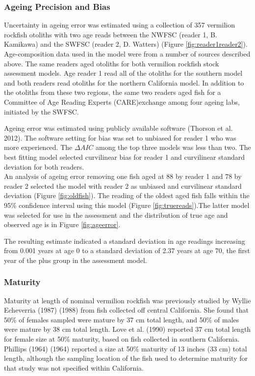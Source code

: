 \documentclass[
  english,
  a4paper,
]{article}
\begin{document}
\hypertarget{ageing-precision-and-bias}{%
\subsubsection{Ageing Precision and Bias}\label{ageing-precision-and-bias}}

Uncertainty in ageing error was estimated using a collection of 357 vermilion rockfish
otoliths with two age reads between the NWFSC (reader 1, B. Kamikawa) and the
SWFSC (reader 2, D. Watters) (Figure \ref{fig:reader1reader2}).
Age-composition data used in the model were from a number of sources described
above. The same readers aged otoliths for both vermilion rockfish stock assessment models.
Age reader 1 read all of the otoliths for the southern model and both readers read
otoliths for the northern California model. In addition to the otoliths from these
two regions, the same two readers aged fish for a Committee of Age Reading Experts
(CARE)exchange among four ageing labs, initiated by the SWFSC.

Ageing error was estimated using publicly available software (Thorson et al. 2012).
The software setting for bias was set to unbiased for reader 1 who was more
experienced. The \(\Delta AIC\) among the top three models was less than two. The
best fitting model selected curvilinear bias for reader 1 and curvilinear standard
deviation for both readers.\\
An analysis of ageing error removing one fish aged at 88 by reader 1 and 78 by reader 2
selected the model with reader 2 as unbiased and curvilinear standard deviation
(Figure \ref{fig:oldfish}). The reading of the oldest aged fish falls within the 95\% confidence
interval using this model (Figure \ref{fig:truereads}).The latter model was selected
for use in the assessment and the distribution of true age and observed
age is in Figure \ref{fig:ageerror}.

The resulting estimate indicated a standard deviation in age readings
increasing from 0.001 years at age 0 to a standard deviation of 2.37 years at age 70,
the first year of the plus group in the assessment model.

\hypertarget{maturity}{%
\subsubsection{Maturity}\label{maturity}}

Maturity at length of nominal vermilion rockfish was previously studied by Wyllie Echeverria (1987) (1988) from fish collected off central California. She found that 50\% of females sampled were mature by 37 cm total length, and 50\% of males were mature by 38 cm total length. Love et al. (1990) reported 37 cm total length for female size at 50\% maturity, based on fish collected in southern California. Phillips (1964) (1964) reported a size at 50\% maturity of 13 inches (33 cm) total length, although the sampling location of the fish used to determine maturity for that study was not specified within California.
\end{document}
